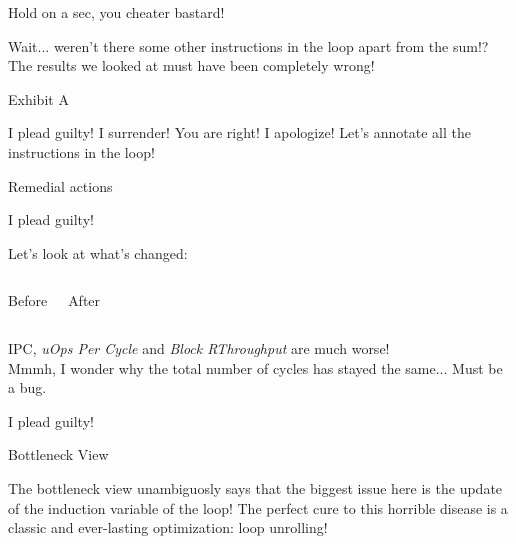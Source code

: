 \begin{frame}{Hold on a sec, you cheater bastard!}
\begin{overprint}
Wait... weren't there \alert{some other instructions in the loop} apart from the sum!?
The results we looked at must have been completely wrong!
\end{overprint}
\begin{block}{Exhibit A}
\end{block}
\end{frame}


\begin{frame}{I plead guilty!}
I surrender! You are right! I apologize! Let's annotate all the instructions in the loop!
\begin{block}{Remedial actions}
\end{block}
\end{frame}


\begin{frame}{I plead guilty!}
\begin{center}
Let's look at what's changed:
%
\begin{columns}

\begin{block}{Before}
\end{block}

\begin{block}{After}
\end{block}

\end{columns}
\medskip
IPC, \emph{uOps Per Cycle} and \emph{Block RThroughput} are much worse!\\
\medskip
{\footnotesize Mmmh, I wonder why the total number of cycles has stayed the same... Must be a bug.}
\end{center}
\end{frame}


\begin{frame}{I plead guilty!}
\begin{center}
\begin{block}{Bottleneck View}
\txtinput[\tt\fontsize{5.7pt}{6pt}\selectfont]{listings/01_add_reduction_v1b_p04.txt}
\end{block}
\medskip
\begin{overprint}
The bottleneck view unambiguosly says that the biggest issue here is the update of the induction variable of the loop!
The perfect cure to this horrible disease is a classic and ever-lasting optimization: \alert{loop unrolling}!
\end{overprint}
\end{center}
\end{frame}


